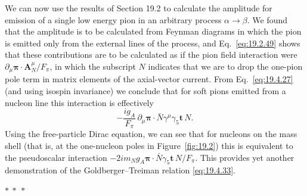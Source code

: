 We can now use the results of Section 19.2 to calculate the amplitude for emission of a single low energy pion in an arbitrary process $\alpha\to\beta$. We found that the amplitude is to be calculated from Feynman diagrams in which the pion is emitted only from the external lines of the process, and Eq.~\eqref{eq:19.2.49} shows that these contributions are to be calculated as if the pion field interaction were $\partial_\mu\boldsymbol{\pi}\cdot\mathbf{A}_N^\mu/F_\pi$, in which the subscript $N$ indicates that we are to drop the one-pion pole term in matrix elements of the axial-vector current. From Eq.~\eqref{eq:19.4.27} (and using isospin invariance) we conclude that for soft pions emitted from a nucleon line this interaction is effectively
\[
-\frac{ig_A}{F_\pi}\,
\partial_\mu\boldsymbol{\pi}\cdot\bar N\gamma^\mu\gamma_5\mathbf{t}\,N.
\]
Using the free-particle Dirac equation, we can see that for nucleons on the mass shell (that is, at the one-nucleon poles in Figure~\ref{fig:19.2}) this is equivalent to the pseudoscalar interaction $-2im_Ng_A\boldsymbol{\pi}\cdot\bar N\gamma_5\mathbf{t}\,N/F_\pi$. This provides yet another demonstration of the Goldberger--Treiman relation \eqref{eq:19.4.33}.

\begin{center}
$* \ * \ *$
\end{center}

